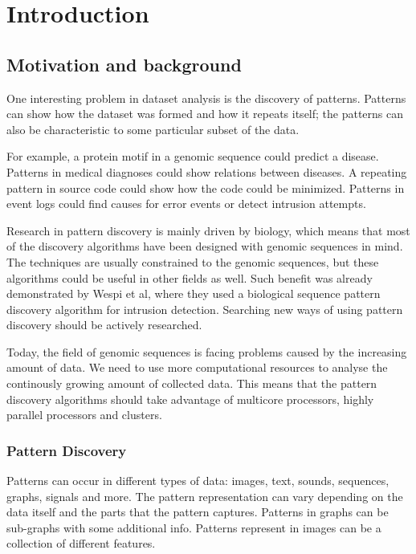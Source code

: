 \chapter{Introduction}
\label{c:introduction}

\section{Motivation and background}

One interesting problem in dataset analysis is the discovery of patterns. Patterns can show how the dataset was formed and how it repeats itself; the patterns can also be characteristic to some particular subset of the data.

For example, a protein motif in a genomic sequence could predict a disease. Patterns in medical diagnoses could show relations between diseases. A repeating pattern in source code could show how the code could be minimized. Patterns in event logs could find causes for error events or detect intrusion attempts.

Research in pattern discovery is mainly driven by biology, which means that most of the discovery algorithms have been designed with genomic sequences in mind. The techniques are usually constrained to the genomic sequences, but these algorithms could be useful in other fields as well. Such benefit was already demonstrated by Wespi et al\cite{IntrusionDetection}, where they used a biological sequence pattern discovery algorithm for intrusion detection. Searching new ways of using pattern discovery should be actively researched.

Today, the field of genomic sequences is facing problems caused by the increasing amount of data\cite{HowIsGenomeDoing}. We need to use more computational resources to analyse the continously growing amount of collected data. This means that the pattern discovery algorithms should take advantage of multicore processors, highly parallel processors and clusters.

\subsection{Pattern Discovery}

Patterns can occur in different types of data: images, text, sounds, sequences, graphs, signals and more. The pattern representation can vary depending on the data itself and the parts that the pattern captures. Patterns in graphs can be sub-graphs with some additional info. Patterns represent in images can be a collection of different features.

